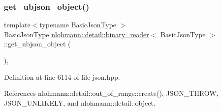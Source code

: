 \subsubsection{\texorpdfstring{get\+\_\+ubjson\+\_\+object()}{get\_ubjson\_object()}}
{\footnotesize\ttfamily template$<$typename Basic\+Json\+Type $>$ \\
Basic\+Json\+Type \hyperlink{classnlohmann_1_1detail_1_1binary__reader}{nlohmann\+::detail\+::binary\+\_\+reader}$<$ Basic\+Json\+Type $>$\+::get\+\_\+ubjson\+\_\+object (\begin{DoxyParamCaption}{ }\end{DoxyParamCaption})\hspace{0.3cm}{\ttfamily [inline]}, {\ttfamily [private]}}



Definition at line 6114 of file json.\+hpp.



References nlohmann\+::detail\+::out\+\_\+of\+\_\+range\+::create(), J\+S\+O\+N\+\_\+\+T\+H\+R\+OW, J\+S\+O\+N\+\_\+\+U\+N\+L\+I\+K\+E\+LY, and nlohmann\+::detail\+::object.


